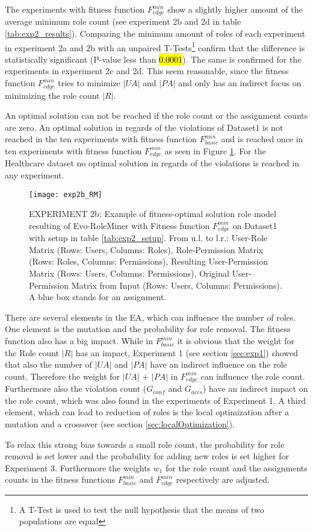The experiments with fitness function $F_{edge}^{min}$ show a slightly higher amount of the average minimum role count (see experiment 2b and 2d in table \ref{tab:exp2_results}). Comparing the minimum amount of roles of each experiment in experiment 2a and 2b with an unpaired T-Tests\footnote{A T-Test is used to test the null hypothesis that the means of two populations are equal} confirm that the difference is statistically significant (P-value less than \hl{0.0001}). The same is confirmed for the experiments in experiment 2c and 2d. This seem reasonable, since the fitness function $F_{edge}^{min}$ tries to minimize $|UA|$ and $|PA|$ and only has an indirect focus on minimizing the role count $|R|$.

An optimal solution can not be reached if the role count or the assignment counts are zero. An optimal solution in regards of the violations of Dataset1 is not reached in the ten experiments with fitness function $F_{basic}^{min}$ and is reached once in ten experiments with fitness function $F_{edge}^{min}$ as seen in Figure \ref{fig:exp2b_RM}. For the Healthcare dataset no optimal solution in regards of the violations is reached in any experiment.

\begin{figure}[H]
	\centering
	\texttt{[image: exp2b\_RM]}
	\caption{EXPERIMENT 2b: Example of fitness-optimal solution role model resulting of Evo-RoleMiner with Fitness function $F_{edge}^{min}$ on Dataset1 with setup in table \ref{tab:exp2_setup}. From u.l. to l.r.: User-Role Matrix (Rows: Users, Columns: Roles), Role-Permission Matrix (Rows: Roles, Columns: Permissions), Resulting User-Permission Matrix (Rows: Users, Columns: Permissions), Original User-Permission Matrix from Input (Rows: Users, Columns: Permissions). A blue box stands for an assignment.}
	\label{fig:exp2b_RM}
\end{figure}

There are several elements in the EA, which can influence the number of roles. One element is the mutation and the probability for role removal. The fitness function also has a big impact. While in $F_{basic}^{min}$ it is obvious that the weight for the Role count $|R|$ has an impact, Experiment 1 (see section \ref{sec:exp1}) showed that also the number of $|UA|$ and $|PA|$ have an indirect influence on the role count. Therefore the weight for $|UA|$ + $|PA|$ in $F_{edge}^{min}$ can influence the role count. Furthermore also the violation count ($G_{conf}$ and $G_{accs}$) have an indirect impact on the role count, which was also found in the experiments of Experiment 1. A third element, which can lead to reduction of roles is the local optimization after a mutation and a crossover (see section \ref{sec:localOptimization}).

To relax this strong bias towards a small role count, the probability for role removal is set lower and the probability for adding new roles is set higher for Experiment 3. Furthermore the weights $w_1$ for the role count and the assignments counts in the fitness functions $F_{basic}^{min}$ and $F_{edge}^{min}$ respectively are adjusted.
